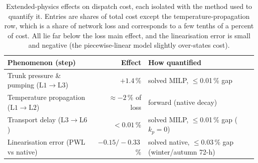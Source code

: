 \documentclass[a4paper,fleqn]{cas-sc} %
\newcommand{\Lone}{\ensuremath{\mathrm{L1}}}    %
\newcommand{\Ltwo}{\ensuremath{\mathrm{L2}}}    %
\newcommand{\Lthree}{\ensuremath{\mathrm{L3}}}  %
\newcommand{\Lsix}{\ensuremath{\mathrm{L6}}}    %
\providecommand{\DIFaddbegin}{} %
\providecommand{\DIFaddend}{} %
\providecommand{\DIFdelend}{} %
\providecommand{\DIFaddendFL}{} %
\providecommand{\DIFdelbeginFL}{} %
\begin{document}
\begin{table}[t]
\DIFaddendFL \centering
\DIFdelbeginFL %
\DIFdelend \DIFaddbegin \caption{Extended-physics effects on dispatch cost, each isolated with the method used to
quantify it. Entries are shares of total cost except the temperature-propagation row, which is a
share of network loss and corresponds to a few tenths of a percent of cost. All lie far below the
loss main effect, and the linearisation error is small and negative (the piecewise-linear model
slightly over-states cost).}
\label{tab:linearisation}
\begin{tabular}{lrl}
\hline
Phenomenon (step) & Effect & How quantified \\
\hline
Trunk pressure \& pumping ($\Lone\!\to\!\Lthree$) & $+1.4$\,\% & solved MILP, $\le$0.01\,\% gap \\
Temperature propagation ($\Lone\!\to\!\Ltwo$) & $\approx-2$\,\% of loss & forward (native decay) \\
Transport delay ($\Lthree\!\to\!\Lsix$) & $<0.01$\,\% & solved MILP, $\le$0.01\,\% gap ($k_p{=}0$) \\
Linearisation error (PWL vs native) & $-0.15/-0.33$\,\% & solved native, $\le$0.03\,\% gap (winter/autumn 72-h) \\
\hline
\end{tabular}
\end{table}
\DIFaddend 
\end{document}
